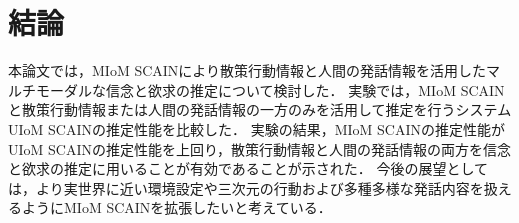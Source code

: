\chapter{結論}
本論文では，MIoM SCAINにより散策行動情報と人間の発話情報を活用したマルチモーダルな信念と欲求の推定について検討した．
実験では，MIoM SCAINと散策行動情報または人間の発話情報の一方のみを活用して推定を行うシステムUIoM SCAINの推定性能を比較した．
実験の結果，MIoM SCAINの推定性能がUIoM SCAINの推定性能を上回り，散策行動情報と人間の発話情報の両方を信念と欲求の推定に用いることが有効であることが示された．
今後の展望としては，より実世界に近い環境設定や三次元の行動および多種多様な発話内容を扱えるようにMIoM SCAINを拡張したいと考えている．
